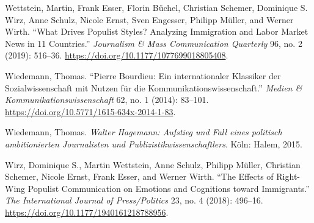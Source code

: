 \documentclass{tufte-handout}
\begin{document}
\begin{hangparas}{.25in}{1}
Wettstein, Martin, Frank Esser, Florin Büchel, Christian Schemer,
Dominique S. Wirz, Anne Schulz, Nicole Ernst, Sven Engesser, Philipp
Müller, and Werner Wirth. ``What Drives Populist Styles? Analyzing
Immigration and Labor Market News in 11 Countries.'' \emph{Journalism \&
Mass Communication Quarterly} 96, no. 2 (2019): 516--36.
\url{https://doi.org/10.1177/1077699018805408}.

Wiedemann, Thomas. ``Pierre Bourdieu: Ein internationaler Klassiker der
Sozialwissenschaft mit Nutzen für die Kommunikationswissenschaft.''
\emph{Medien \& Kommunikationswissenschaft} 62, no. 1 (2014): 83--101.
\url{https://doi.org/10.5771/1615-634x-2014-1-83}.

Wiedemann, Thomas. \emph{Walter Hagemann: Aufstieg und Fall eines
politisch ambitionierten Journalisten und Publizistikwissenschaftlers}.
Köln: Halem, 2015.

Wirz, Dominique S., Martin Wettstein, Anne Schulz, Philipp Müller,
Christian Schemer, Nicole Ernst, Frank Esser, and Werner Wirth. ``The
Effects of Right-Wing Populist Communication on Emotions and Cognitions
toward Immigrants.'' \emph{The International Journal of Press/Politics}
23, no. 4 (2018): 496--16.
\url{https://doi.org/10.1177/1940161218788956}.



\end{hangparas}
\end{document}
